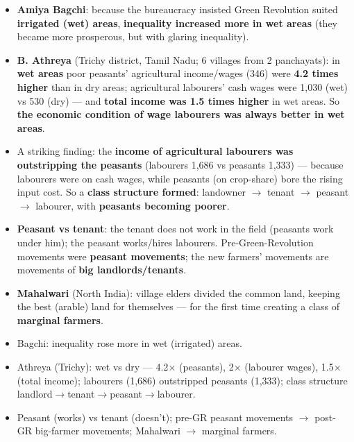 \begin{KeyConcept}
\begin{itemize}
\item \textbf{Amiya Bagchi}: because the bureaucracy insisted Green Revolution suited \textbf{irrigated (wet) areas}, \textbf{inequality increased more in wet areas} (they became more prosperous, but with glaring inequality).
\item \textbf{B. Athreya} (Trichy district, Tamil Nadu; 6 villages from 2 panchayats): in \textbf{wet areas} poor peasants' agricultural income/wages (\rupee{}346) were \textbf{4.2 times higher} than in dry areas; agricultural labourers' cash wages were \rupee{}1,030 (wet) vs \rupee{}530 (dry) --- and \textbf{total income was 1.5 times higher} in wet areas. So \textbf{the economic condition of wage labourers was always better in wet areas}.
\item A striking finding: the \textbf{income of agricultural labourers was outstripping the peasants} (labourers \rupee{}1,686 vs peasants \rupee{}1,333) --- because labourers were on cash wages, while peasants (on crop-share) bore the rising input cost. So a \textbf{class structure formed}: landowner $\rightarrow$ tenant $\rightarrow$ peasant $\rightarrow$ labourer, with \textbf{peasants becoming poorer}.
\item \textbf{Peasant vs tenant}: the tenant does not work in the field (peasants work under him); the peasant works/hires labourers. Pre-Green-Revolution movements were \textbf{peasant movements}; the new farmers' movements are movements of \textbf{big landlords/tenants}.
\item \textbf{Mahalwari} (North India): village elders divided the common land, keeping the best (arable) land for themselves --- for the first time creating a class of \textbf{marginal farmers}.
\end{itemize}
\end{KeyConcept}

\begin{QuickRevision}
\begin{itemize}
\item Bagchi: inequality rose more in wet (irrigated) areas.
\item Athreya (Trichy): wet vs dry --- 4.2$\times$ (peasants), 2$\times$ (labourer wages), 1.5$\times$ (total income); labourers (\rupee{}1,686) outstripped peasants (\rupee{}1,333); class structure landlord$\rightarrow$tenant$\rightarrow$peasant$\rightarrow$labourer.
\item Peasant (works) vs tenant (doesn't); pre-GR peasant movements $\rightarrow$ post-GR big-farmer movements; Mahalwari $\rightarrow$ marginal farmers.
\end{itemize}
\end{QuickRevision}

